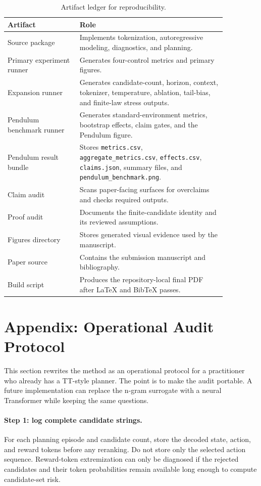 \documentclass{article}
\begin{document}
\begin{table}[H]
\caption{Artifact ledger for reproducibility.}
\label{tab:artifact-ledger}
\begin{center}
\small
\begin{tabular}{p{0.28\linewidth}p{0.58\linewidth}}
\toprule
Artifact & Role \\
\midrule
Source package & Implements tokenization, autoregressive modeling, diagnostics, and planning. \\
Primary experiment runner & Generates four-control metrics and primary figures. \\
Expansion runner & Generates candidate-count, horizon, context, tokenizer, temperature, ablation, tail-bias, and finite-law stress outputs. \\
Pendulum benchmark runner & Generates standard-environment metrics, bootstrap effects, claim gates, and the Pendulum figure. \\
Pendulum result bundle & Stores \texttt{metrics.csv}, \texttt{aggregate\_metrics.csv}, \texttt{effects.csv}, \texttt{claims.json}, summary files, and \texttt{pendulum\_benchmark.png}. \\
Claim audit & Scans paper-facing surfaces for overclaims and checks required outputs. \\
Proof audit & Documents the finite-candidate identity and its reviewed assumptions. \\
Figures directory & Stores generated visual evidence used by the manuscript. \\
Paper source & Contains the submission manuscript and bibliography. \\
Build script & Produces the repository-local final PDF after LaTeX and BibTeX passes. \\
\bottomrule
\end{tabular}
\end{center}
\end{table}

\section{Appendix: Operational Audit Protocol}

This section rewrites the method as an operational protocol for a practitioner who already has a TT-style planner. The point is to make the audit portable. A future implementation can replace the n-gram surrogate with a neural Transformer while keeping the same questions.

\paragraph{Step 1: log complete candidate strings.}
For each planning episode and candidate count, store the decoded state, action, and reward tokens before any reranking. Do not store only the selected action sequence. Reward-token extremization can only be diagnosed if the rejected candidates and their token probabilities remain available long enough to compute candidate-set risk.
\end{document}
